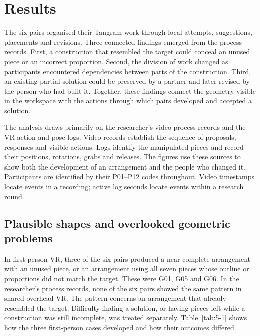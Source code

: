 \chapter{Results}\label{chap:5}

The six pairs organised their Tangram work through local attempts, suggestions, placements and revisions. Three connected findings emerged from the process records. First, a construction that resembled the target could conceal an unused piece or an incorrect proportion. Second, the division of work changed as participants encountered dependencies between parts of the construction. Third, an existing partial solution could be preserved by a partner and later revised by the person who had built it. Together, these findings connect the geometry visible in the workspace with the actions through which pairs developed and accepted a solution.

The analysis draws primarily on the researcher's video process records and the VR action and pose logs. Video records establish the sequence of proposals, responses and visible actions. Logs identify the manipulated pieces and record their positions, rotations, grabs and releases. The figures use these sources to show both the development of an arrangement and the people who changed it. Participants are identified by their P01--P12 codes throughout. Video timestamps locate events in a recording; active log seconds locate events within a research round.

\section{Plausible shapes and overlooked geometric problems}\label{sec:5-1}

In first-person VR, three of the six pairs produced a near-complete arrangement with an unused piece, or an arrangement using all seven pieces whose outline or proportions did not match the target. These were G01, G05 and G06. In the researcher's process records, none of the six pairs showed the same pattern in shared-overhead VR. The pattern concerns an arrangement that already resembled the target. Difficulty finding a solution, or having pieces left while a construction was still incomplete, was treated separately. Table~\ref{tab:5-1} shows how the three first-person cases developed and how their outcomes differed.

